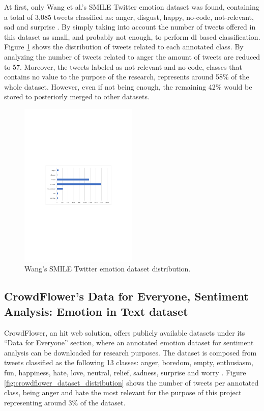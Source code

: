 At first, only Wang et al.'s SMILE Twitter emotion dataset was found, containing a total of 3,085 tweets classified as: anger, disgust, happy, no-code, not-relevant, sad and surprise \cite{wang2016smile}. By simply taking into account the number of tweets offered in this dataset as small, and probably not enough, to perform \acrshort{dl} based classification. Figure \ref{fig:smile_dataset_distribution} shows the distribution of tweets related to each annotated class. By analyzing the number of tweets related to anger the amount of tweets are reduced to 57. Moreover, the tweets labeled as not-relevant and no-code, classes that contains no value to the purpose of the research, represents around 58\% of the whole dataset. However, even if not being enough, the remaining 42\% would be stored to posteriorly merged to other datasets.

\begin{figure}[!htp]
  \center
  \includegraphics[width=0.5\textwidth]{figures/SMILE_dataset_distribution}
  \caption{Wang's SMILE Twitter emotion dataset distribution.}
  \label{fig:smile_dataset_distribution}
\end{figure}

\subsection{CrowdFlower's Data for Everyone, Sentiment Analysis: Emotion in Text dataset}

CrowdFlower, an \acrshort{hit} web solution, offers publicly available datasets under its ``Data for Everyone'' section, where an annotated emotion dataset for sentiment analysis can be downloaded for research purposes. The dataset is composed from tweets classified as the following 13 classes: anger, boredom, empty, enthusiasm, fun, happiness, hate, love, neutral, relief, sadness, surprise and worry \cite{CrowdFlowerDfE}. Figure \ref{fig:crowdflower_dataset_distribution} shows the number of tweets per annotated class, being anger and hate the most relevant for the purpose of this project representing around 3\% of the dataset.

